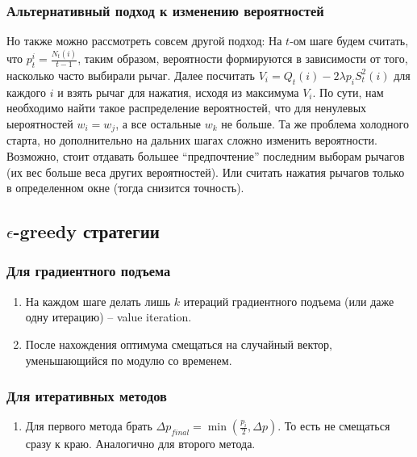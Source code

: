 \documentclass{article}
\begin{document}
\subsubsection{Альтернативный подход к изменению вероятностей} \label{subsec:1}

Но также можно рассмотреть совсем другой подход: На $t$-ом шаге будем считать, что $p_t^i = \frac{N_t(i)}{t-1}$, таким образом, вероятности формируются в зависимости от того, насколько часто выбирали рычаг. Далее посчитать $V_i = Q_t(i) - 2 \lambda p_i S_t^2(i)$ для каждого $i$ и взять рычаг для нажатия, исходя из максимума $V_i$. По сути, нам необходимо найти такое распределение вероятностей, что для ненулевых ыероятностей $w_i = w_j$, а все остальные $w_k$ не больше. Та же проблема холодного старта, но дополнительно на дальних шагах сложно изменить вероятности. Возможно, стоит отдавать большее ``предпочтение'' последним выборам рычагов (их вес больше веса других вероятностей). Или считать нажатия рычагов только в определенном окне (тогда снизится точность).

\subsection{\(\epsilon\)-greedy стратегии}

\subsubsection{Для градиентного подъема}

\begin{enumerate}
    \item На каждом шаге делать лишь $k$ итераций градиентного подъема (или даже одну итерацию) -- value iteration.
    \item После нахождения оптимума смещаться на случайный вектор, уменьшающийся по модулю со временем.
\end{enumerate}

\subsubsection{Для итеративных методов}
\begin{enumerate}
    \item Для первого метода брать $\Delta p_{final} = \min (\frac{p_i}{2}, \Delta p)$. То есть не смещаться сразу к краю. Аналогично для второго метода.
\end{enumerate}
\end{document}
